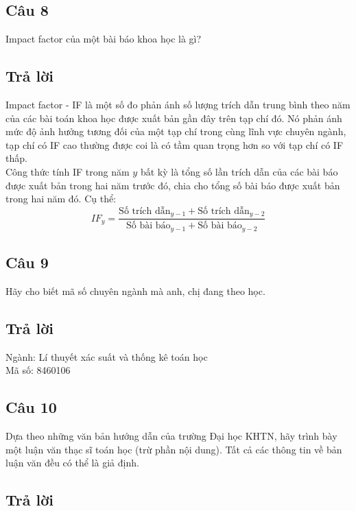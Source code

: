 \subsection*{Câu 8}
Impact factor của một bài báo khoa học là gì?
\subsection*{Trả lời}
Impact factor - IF là một số đo phản ánh số lượng trích dẫn trung bình theo năm của các bài toán khoa học được xuất bản gần đây trên tạp chí đó.
Nó phản ánh mức độ ảnh hưởng tương đối của một tạp chí trong cùng lĩnh vực chuyên ngành, tạp chí có IF cao thường được coi là có tầm quan trọng hơn so với tạp chí có IF thấp.\\
Công thức tính IF trong năm $y$ bất kỳ là tổng số lần trích dẫn của các bài báo được xuất bản trong hai năm trước đó, chia cho tổng số bài báo được xuất bản trong hai năm đó. Cụ thể:
\[ 
    IF_y = \frac{\text{Số trích dẫn}_{y-1} + \text{Số trích dẫn}_{y-2}}{\text{Số bài báo}_{y-1} + \text{Số bài báo}_{y-2}}
\]
\subsection*{Câu 9}
Hãy cho biết mã số chuyên ngành mà anh, chị đang theo học.
\subsection*{Trả lời}
Ngành: Lí thuyết xác suất và thống kê toán học\\
Mã số: 8460106
\subsection*{Câu 10}
Dựa theo những văn bản hướng dẫn của trường Đại học
KHTN, hãy trình bày một luận văn thạc sĩ toán học (trừ phần nội dung).
Tất cả các thông tin về bản luận văn đều có thể là giả định.
\subsection*{Trả lời}
\newpage
